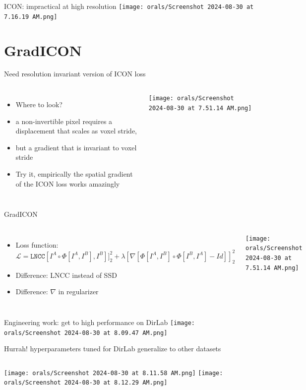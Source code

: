 \documentclass{beamer}
\begin{document}
	\begin{frame}{ICON: impractical at high resolution}
		\texttt{[image: orals/Screenshot 2024-08-30 at 7.16.19 AM.png]}
	\end{frame}

\section{GradICON}

\begin{frame}{Need resolution invariant version of ICON loss}
	\begin{columns}
	\begin{itemize}
		\item Where to look?
		\item a non-invertible pixel requires a displacement that scales as voxel stride, 
		\item but a gradient that is invariant to voxel stride
		\item Try it, empirically the spatial gradient of the ICON loss works amazingly
	\end{itemize}
		\texttt{[image: orals/Screenshot 2024-08-30 at 7.51.14 AM.png]}
	\end{columns}
	\end{frame}
\begin{frame}{GradICON}
	\begin{columns}
		\column{.5\textwidth}
	\begin{itemize}
		\item Loss function: $\mathcal{L} = \texttt{LNCC}[I^A \circ \Phi[I^A, I^B], I^B]]^2_2 + \lambda [\nabla[\Phi[I^A, I^B] \circ \Phi[I^B, I^A] - Id] ]^2_2$
		\item Difference: LNCC instead of SSD
		\item Difference: $\nabla$ in regularizer
	\end{itemize}
		\column{.5\textwidth}
		\texttt{[image: orals/Screenshot 2024-08-30 at 7.51.14 AM.png]}
	\end{columns}
	\end{frame}

	\begin{frame}{Engineering work: get to high performance on DirLab}
		\texttt{[image: orals/Screenshot 2024-08-30 at 8.09.47 AM.png]}
	\end{frame}

	\begin{frame}{Hurrah! hyperparameters tuned for DirLab generalize to other datasets}
	\begin{columns}
		\texttt{[image: orals/Screenshot 2024-08-30 at 8.11.58 AM.png]}
		\texttt{[image: orals/Screenshot 2024-08-30 at 8.12.29 AM.png]}
	\end{columns}
	\end{frame}
\end{document}
